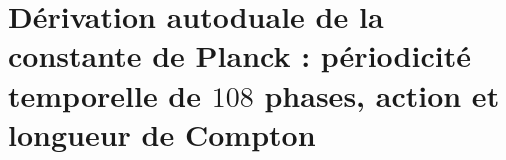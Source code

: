 \chapter{Dérivation autoduale de la constante de Planck : périodicité temporelle de \(108\) phases, action et longueur de Compton}
\label{chap:p3-final:36:planck_autodual}



